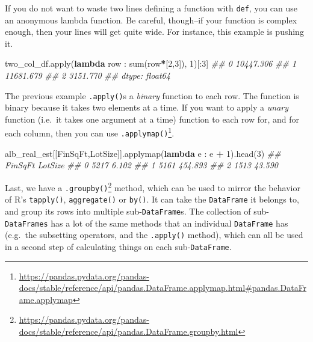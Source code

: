 \documentclass[
  12pt,
  krantz2]{krantz}
\makeatletter
\newenvironment{Shaded}{\begin{snugshade}}{\end{snugshade}}
\newcommand{\BuiltInTok}[1]{#1}
\newcommand{\CommentTok}[1]{\textcolor[rgb]{0.37,0.37,0.37}{\textit{#1}}}
\newcommand{\DecValTok}[1]{\textcolor[rgb]{0.06,0.06,0.06}{#1}}
\newcommand{\KeywordTok}[1]{\textcolor[rgb]{0.27,0.27,0.27}{\textbf{#1}}}
\newcommand{\NormalTok}[1]{#1}
\newcommand{\OperatorTok}[1]{\textcolor[rgb]{0.43,0.43,0.43}{\textbf{#1}}}
\newcommand{\StringTok}[1]{\textcolor[rgb]{0.5,0.5,0.5}{#1}}
\renewcommand{\href}[2]{#2\footnote{\url{#1}}}
\newenvironment{kframe}{%
\medskip{}
\setlength{\fboxsep}{.8em}
 \def\at@end@of@kframe{}%
 \ifinner\ifhmode%
  \def\at@end@of@kframe{\end{minipage}}%
  \begin{minipage}{\columnwidth}%
 \fi\fi%
 \def\FrameCommand##1{\hskip\@totalleftmargin \hskip-\fboxsep
 \colorbox{shadecolor}{##1}\hskip-\fboxsep
     \hskip-\linewidth \hskip-\@totalleftmargin \hskip\columnwidth}%
 \MakeFramed {\advance\hsize-\width
   \@totalleftmargin\z@ \linewidth\hsize
   \@setminipage}}%
 {\par\unskip\endMakeFramed%
 \at@end@of@kframe}
\renewenvironment{Shaded}{\begin{kframe}}{\end{kframe}}
\makeatother
\begin{document}
If you do not want to waste two lines defining a function with \texttt{def}, you can use an anonymous lambda function. Be careful, though--if your function is complex enough, then your lines will get quite wide. For instance, this example is pushing it.

\begin{Shaded}
\begin{Highlighting}[]
\NormalTok{two\_col\_df.}\BuiltInTok{apply}\NormalTok{(}\KeywordTok{lambda}\NormalTok{ row : }\BuiltInTok{sum}\NormalTok{(row}\OperatorTok{*}\NormalTok{[}\DecValTok{2}\NormalTok{,}\DecValTok{3}\NormalTok{]), }\DecValTok{1}\NormalTok{)[:}\DecValTok{3}\NormalTok{]}
\CommentTok{\#\# 0    10447.306}
\CommentTok{\#\# 1    11681.679}
\CommentTok{\#\# 2     3151.770}
\CommentTok{\#\# dtype: float64}
\end{Highlighting}
\end{Shaded}

The previous example \texttt{.apply()}s a \emph{binary} function to each row. The function is binary because it takes two elements at a time. If you want to apply a \emph{unary} function (i.e.~it takes one argument at a time) function to each row for, and for each column, then you can use \href{https://pandas.pydata.org/pandas-docs/stable/reference/api/pandas.DataFrame.applymap.html\#pandas.DataFrame.applymap}{\texttt{.applymap()}}.

\begin{Shaded}
\begin{Highlighting}[]
\NormalTok{alb\_real\_est[[}\StringTok{\textquotesingle{}FinSqFt\textquotesingle{}}\NormalTok{,}\StringTok{\textquotesingle{}LotSize\textquotesingle{}}\NormalTok{]].applymap(}\KeywordTok{lambda}\NormalTok{ e : e }\OperatorTok{+} \DecValTok{1}\NormalTok{).head(}\DecValTok{3}\NormalTok{)}
\CommentTok{\#\#    FinSqFt  LotSize}
\CommentTok{\#\# 0     5217    6.102}
\CommentTok{\#\# 1     5161  454.893}
\CommentTok{\#\# 2     1513   43.590}
\end{Highlighting}
\end{Shaded}

Last, we have a \href{https://pandas.pydata.org/pandas-docs/stable/reference/api/pandas.DataFrame.groupby.html}{\texttt{.groupby()}} method, which can be used to mirror the behavior of R's \texttt{tapply()}, \texttt{aggregate()} or \texttt{by()}. It can take the \texttt{DataFrame} it belongs to, and group its rows into multiple sub-\texttt{DataFrame}s. The collection of sub-\texttt{DataFrames} has a lot of the same methods that an individual \texttt{DataFrame} has (e.g.~the subsetting operators, and the \texttt{.apply()} method), which can all be used in a second step of calculating things on each sub-\texttt{DataFrame}.
\end{document}
